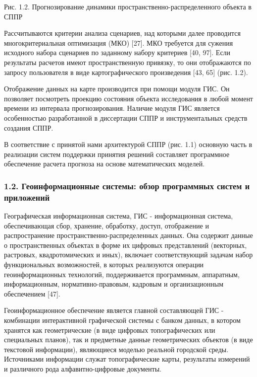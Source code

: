 \documentclass{article}
\begin{document}
\fancyfoot[LE]{\thepage{}}
\fancyfoot[LO]{\thepage{}}

\begin{center}
Рис. 1.2. Прогнозирование динамики пространственно-распределенного 
объекта в СППР\label{OLEHLINK6}\label{OLEHLINK7}
\end{center}

Рассчитываются критерии анализа сценариев, 
над которыми далее проводится многокритериальная 
оптимизация (МКО) [27]. МКО требуется для сужения 
исходного набора сценариев по заданному набору 
критериев [40, 97]. Если результаты расчетов имеют 
пространственную привязку, то они отображаются 
по запросу пользователя в виде картографического 
произведения [43, 65] (рис. 1.2).

Отображение данных на карте производится при 
помощи модуля ГИС. Он позволяет посмотреть 
проекцию состояния объекта исследования в 
любой момент времени из интервала прогнозирования. 
Наличие модуля ГИС является особенностью разработанной 
в диссертации СППР и инструментальных средств 
создания СППР.

В соответствие с принятой нами архитектурой 
СППР (рис. 1.1) основную часть в реализации систем 
поддержки принятия решений составляет программное 
обеспечение расчета прогноза на основе математических 
моделей. \label{HToc199746717}

\subsubsection*{\textbf{1.2. Геоинформационные системы: 
обзор программных систем и приложений}}

Географическая информационная система, ГИС 
- информационная система, обеспечивающая сбор, 
хранение, обработку, доступ, отображение и распространение 
пространственно-распределенных данных. Она 
содержит данные о пространственных объектах 
в форме их цифровых представлений (векторных, 
растровых, квадротомических и иных), включает 
соответствующий задачам набор функциональных 
возможностей, в которых реализуются операции 
геоинформационных технологий, поддерживается 
программным, аппаратным, информационным, нормативно-правовым, 
кадровым и организационным обеспечением [47]. 

Геоинформационное обеспечение является главной 
составляющей ГИС - комбинации интерактивной 
графической системы с банком данных, в котором 
хранятся как геометрические (в виде цифровых 
топографических или специальных планов), так 
и предметные данные геометрических объектов 
(в виде текстовой  информации), являющиеся моделью 
реальной городской среды. Источниками информации 
служат топографические карты, результаты измерений 
и различного рода алфавитно-цифровые документы.
\end{document}
